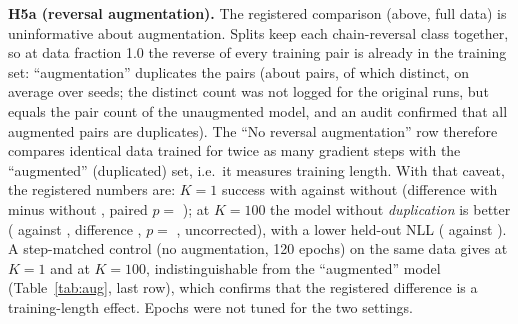 \textbf{H5a (reversal augmentation).} The registered comparison (above, full data) is uninformative about augmentation. Splits keep each chain-reversal class together, so at data fraction 1.0 the reverse of every training pair is already in the training set: ``augmentation'' duplicates the pairs (about  pairs, of which  distinct, on average over seeds; the distinct count was not logged for the original runs, but equals the pair count of the unaugmented model, and an audit confirmed that all augmented pairs are duplicates). The ``No reversal augmentation'' row therefore compares identical data trained for twice as many gradient steps with the ``augmented'' (duplicated) set, i.e.\ it measures training length. With that caveat, the registered numbers are: $K=1$ success  with against  without (difference with minus without , paired $p=$ ); at $K=100$ the model without \emph{duplication} is better ( against , difference , $p=$ , uncorrected), with a lower held-out NLL ( against ). A step-matched control (no augmentation, 120 epochs) on the same data gives  at $K=1$ and  at $K=100$, indistinguishable from the ``augmented'' model (Table~\ref{tab:aug}, last row), which confirms that the registered difference is a training-length effect. Epochs were not tuned for the two settings.

